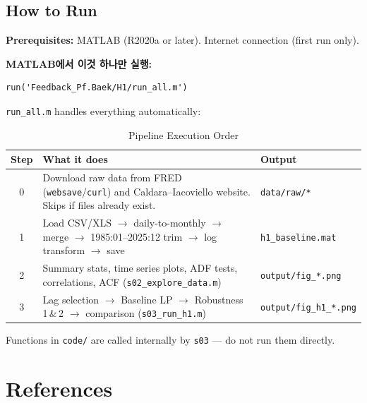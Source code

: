 \documentclass[11pt,a4paper]{article}
\begin{document}
\subsection{How to Run}

\textbf{Prerequisites:} MATLAB (R2020a or later). Internet connection (first run only).

\medskip
\noindent\textbf{MATLAB에서 이것 하나만 실행:}

\begin{verbatim}
run('Feedback_Pf.Baek/H1/run_all.m')
\end{verbatim}

\noindent \texttt{run\_all.m} handles everything automatically:

\begin{table}[H]
\centering
\caption{Pipeline Execution Order}
\label{tab:execution}
\small
\begin{tabularx}{\textwidth}{@{}c X l@{}}
\toprule
\textbf{Step} & \textbf{What it does} & \textbf{Output} \\
\midrule
0 & Download raw data from FRED (\texttt{websave}/\texttt{curl}) and Caldara--Iacoviello website. Skips if files already exist. & \texttt{data/raw/*} \\
1 & Load CSV/XLS $\to$ daily-to-monthly $\to$ merge $\to$ 1985:01--2025:12 trim $\to$ log transform $\to$ save & \texttt{h1\_baseline.mat} \\
2 & Summary stats, time series plots, ADF tests, correlations, ACF (\texttt{s02\_explore\_data.m}) & \texttt{output/fig\_*.png} \\
3 & Lag selection $\to$ Baseline LP $\to$ Robustness 1\,\&\,2 $\to$ comparison (\texttt{s03\_run\_h1.m}) & \texttt{output/fig\_h1\_*.png} \\
\bottomrule
\end{tabularx}
\end{table}

\noindent Functions in \texttt{code/} are called internally by \texttt{s03} --- do not run them directly.

\section*{References}
\end{document}
